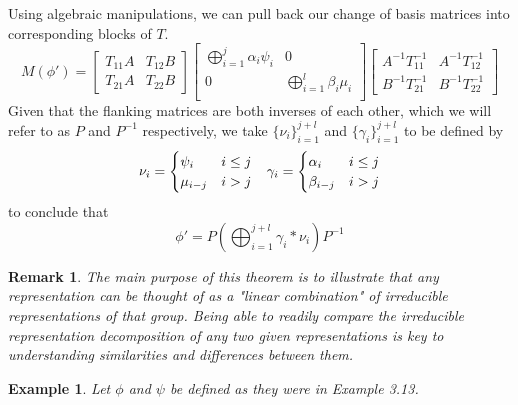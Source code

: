\documentclass[10pt]{ucthesis}
\newtheorem{example}[definition]{Example}
\newtheorem{remark}[definition]{Remark}
\begin{document}
Using algebraic manipulations, we can pull back our change of basis matrices into corresponding blocks of $T$.
\begin{equation}
	M(\phi') =  \begin{bmatrix}
					T_{11}A & T_{12}B \\
					T_{21}A & T_{22}B
				\end{bmatrix}
				\begin{bmatrix}
					\bigoplus_{i=1}^j \alpha_i\psi_i & 0\\
					0 &  \bigoplus_{i=1}^{l} \beta_i\mu_i \\
				\end{bmatrix}
				\begin{bmatrix}
					A^{-1}T_{11}^{-1} & A^{-1}T_{12}^{-1} \\
					B^{-1}T_{21}^{-1} & B^{-1}T_{22}^{-1}
				\end{bmatrix}
\end{equation}
Given that the flanking matrices are both inverses of each other, which we will refer to as $P$ and $P^{-1}$ respectively, we take $\{\nu_i\}_{i=1}^{j+l}$ and  $\{\gamma_i\}_{i=1}^{j+l}$ to be defined by 
$$\begin{array}{c c}
	\nu_i = \begin{cases}
		\psi_i & i \leq j\\
		\mu_{i-j} & i > j
	\end{cases}
&
	\gamma_i = \begin{cases}
		\alpha_i & i \leq j\\
		\beta_{i-j} & i > j
	\end{cases}
\end{array}$$
to conclude that
\begin{equation}
	\phi' = P\left(\bigoplus_{i=1}^{j+l} \gamma_i*\nu_i\right)P^{-1}
\end{equation} \qedsymbol

\begin{remark}
	The main purpose of this theorem is to illustrate that any representation can be thought of as a "linear combination" of irreducible representations of that group. Being able to readily compare the irreducible representation decomposition of any two given representations is key to understanding similarities and differences between them.
\end{remark}

\begin{example}
	Let $\phi$ and $\psi$ be defined as they were in Example 3.13. 
\end{example}
\end{document}
